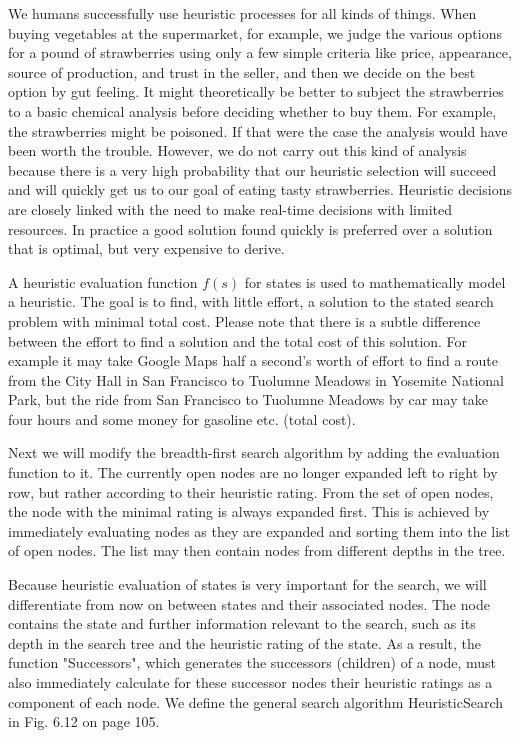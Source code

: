 \documentclass[10pt]{book}
\begin{document}
We humans successfully use heuristic processes for all kinds of things. When buying vegetables at the supermarket, for example, we judge the various options for a pound of strawberries using only a few simple criteria like price, appearance, source of production, and trust in the seller, and then we decide on the best option by gut feeling. It might theoretically be better to subject the strawberries to a basic chemical analysis before deciding whether to buy them. For example, the strawberries might be poisoned. If that were the case the analysis would have been worth the trouble. However, we do not carry out this kind of analysis because there is a very high probability that our heuristic selection will succeed and will quickly get us to our goal of eating tasty strawberries.
Heuristic decisions are closely linked with the need to make real-time decisions with limited resources. In practice a good solution found quickly is preferred over a solution that is optimal, but very expensive to derive.

A heuristic evaluation function $f(s)$ for states is used to mathematically model a heuristic. The goal is to find, with little effort, a solution to the stated search problem with minimal total cost. Please note that there is a subtle difference between the effort to find a solution and the total cost of this solution. For example it may take Google Maps half a second's worth of effort to find a route from the City Hall in San Francisco to Tuolumne Meadows in Yosemite National Park, but the ride from San Francisco to Tuolumne Meadows by car may take four hours and some money for gasoline etc. (total cost).

Next we will modify the breadth-first search algorithm by adding the evaluation function to it. The currently open nodes are no longer expanded left to right by row, but rather according to their heuristic rating. From the set of open nodes, the node with the minimal rating is always expanded first. This is achieved by immediately evaluating nodes as they are expanded and sorting them into the list of open nodes. The list may then contain nodes from different depths in the tree.

Because heuristic evaluation of states is very important for the search, we will differentiate from now on between states and their associated nodes. The node contains the state and further information relevant to the search, such as its depth in the search tree and the heuristic rating of the state. As a result, the function "Successors", which generates the successors (children) of a node, must also immediately calculate for these successor nodes their heuristic ratings as a component of each node. We define the general search algorithm HeuristicSearch in Fig. 6.12 on page 105.
\end{document}

